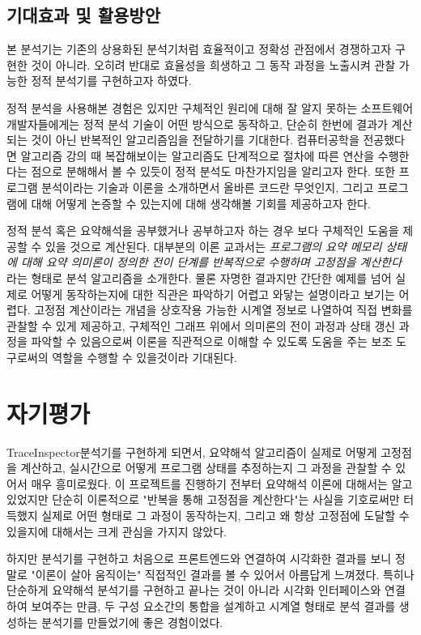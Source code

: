 \documentclass[a4paper,12pt]{article}
\newcommand{\traceinspector}{\textsf{TraceInspector}}
\begin{document}
\subsection{기대효과 및 활용방안}

본 분석기는 기존의 상용화된 분석기처럼 효율적이고 정확성 관점에서 경쟁하고자 구현한 것이 아니라. 오히려 반대로 효율성을 희생하고 그 동작 과정을 노출시켜 관찰 가능한 정적 분석기를 구현하고자 하였다.

정적 분석을 사용해본 경험은 있지만 구체적인 원리에 대해 잘 알지 못하는 소프트웨어 개발자들에게는 정적 분석 기술이 어떤 방식으로 동작하고, 단순히 한번에 결과가 계산되는 것이 아닌 반복적인 알고리즘임을 
전달하기를 기대한다. 컴퓨터공학을 전공했다면 알고리즘 강의 때 복잡해보이는 알고리즘도 단계적으로 절차에 따른 연산을 수행한다는 점으로 분해해서 볼 수 있듯이 정적 분석도 마찬가지임을 알리고자 한다. 
또한 프로그램 분석이라는 기술과 이론을 소개하면서 올바른 코드란 무엇인지, 그리고 프로그램에 대해 어떻게 논증할 수 있는지에 대해 생각해볼 기회를 제공하고자 한다.

정적 분석 혹은 요약해석을 공부했거나 공부하고자 하는 경우 보다 구체적인 도움을 제공할 수 있을 것으로 계산된다. 대부분의 이론 교과서는 \textit{프로그램의 요약 메모리 상태에 대해 요약 의미론이 정의한 전이 단계를 반복적으로 수행하며 고정점을 계산한다} 라는 형태로 
분석 알고리즘을 소개한다. 물론 자명한 결과지만 간단한 예제를 넘어 실제로 어떻게 동작하는지에 대한 직관은 파악하기 어렵고 와닿는 설명이라고 보기는 어렵다. 고정점 계산이라는 개념을 상호작용 가능한 시계열 정보로 나열하여 직접 변화를 관찰할 수 있게 제공하고, 구체적인 그래프 위에서 
의미론의 전이 과정과 상태 갱신 과정을 파악할 수 있음으로써 이론을 직관적으로 이해할 수 있도록 도움을 주는 보조 도구로써의 역할을 수행할 수 있을것이라 기대된다.

\section{자기평가}

\traceinspector 분석기를 구현하게 되면서, 요약해석 알고리즘이 실제로 어떻게 고정점을 계산하고, 실시간으로 어떻게 프로그램 상태를 추정하는지 그 과정을 관찰할 수 있어서 매우 흥미로웠다.
이 프로젝트를 진행하기 전부터 요약해석 이론에 대해서는 알고 있었지만 단순히 이론적으로 "반복을 통해 고정점을 계산한다"는 사실을 기호로써만 터득했지 실제로 어떤 형태로 그 과정이 동작하는지, 
그리고 왜 항상 고정점에 도달할 수 있을지에 대해서는 크게 관심을 가지지 않았다.

하지만 분석기를 구현하고 처음으로 프론트엔드와 연결하여 시각화한 결과를 보니 정말로 "이론이 살아 움직이는" 직접적인 결과를 볼 수 있어서 아름답게 느껴졌다. 특히나 단순하게 요약해석 분석기를 구현하고 끝나는 것이 아니라 
시각화 인터페이스와 연결하여 보여주는 만큼, 두 구성 요소간의 통합을 설계하고 시계열 형태로 분석 결과를 생성하는 분석기를 만들었기에 좋은 경험이었다.
\end{document}
